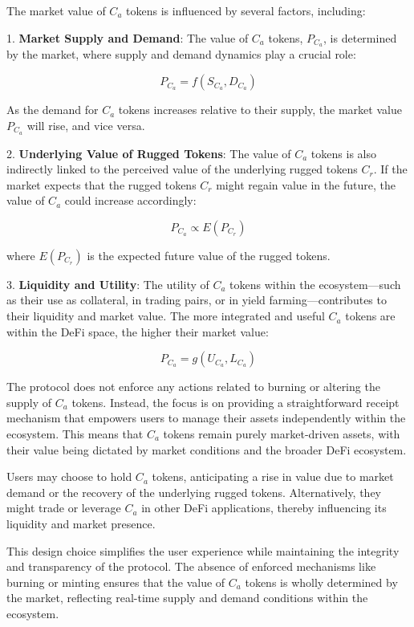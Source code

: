 \documentclass{article}
\begin{document}
The market value of $C_a$ tokens is influenced by several factors, including:

1. \textbf{Market Supply and Demand}: The value of $C_a$ tokens, $P_{C_a}$, is determined by the market, where supply and demand dynamics play a crucial role:

\[
P_{C_a} = f(S_{C_a}, D_{C_a})
\]

As the demand for $C_a$ tokens increases relative to their supply, the market value $P_{C_a}$ will rise, and vice versa.

2. \textbf{Underlying Value of Rugged Tokens}: The value of $C_a$ tokens is also indirectly linked to the perceived value of the underlying rugged tokens $C_r$. If the market expects that the rugged tokens $C_r$ might regain value in the future, the value of $C_a$ could increase accordingly:

\[
P_{C_a} \propto E(P_{C_r})
\]

where $E(P_{C_r})$ is the expected future value of the rugged tokens.

3. \textbf{Liquidity and Utility}: The utility of $C_a$ tokens within the ecosystem—such as their use as collateral, in trading pairs, or in yield farming—contributes to their liquidity and market value. The more integrated and useful $C_a$ tokens are within the DeFi space, the higher their market value:

\[
P_{C_a} = g(U_{C_a}, L_{C_a})
\]

The protocol does not enforce any actions related to burning or altering the supply of $C_a$ tokens. Instead, the focus is on providing a straightforward receipt mechanism that empowers users to manage their assets independently within the ecosystem. This means that $C_a$ tokens remain purely market-driven assets, with their value being dictated by market conditions and the broader DeFi ecosystem. 

Users may choose to hold $C_a$ tokens, anticipating a rise in value due to market demand or the recovery of the underlying rugged tokens. Alternatively, they might trade or leverage $C_a$ in other DeFi applications, thereby influencing its liquidity and market presence.

This design choice simplifies the user experience while maintaining the integrity and transparency of the protocol. The absence of enforced mechanisms like burning or minting ensures that the value of $C_a$ tokens is wholly determined by the market, reflecting real-time supply and demand conditions within the ecosystem.
\end{document}
